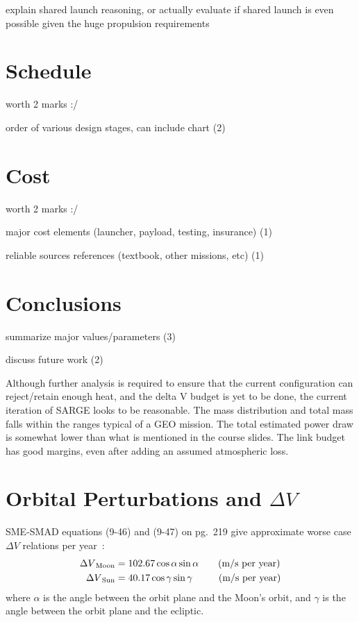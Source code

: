 \documentclass[9pt]{article}
\begin{document}
explain shared launch reasoning, or actually evaluate if shared launch is even possible given the huge propulsion requirements


\section{Schedule}
worth 2 marks :/

order of various design stages, can include chart (2)

\section{Cost}
worth 2 marks :/

major cost elements (launcher, payload, testing, insurance) (1)

reliable sources references (textbook, other missions, etc) (1)


\section{Conclusions}
summarize major values/parameters (3)

discuss future work (2)

Although further analysis is required to ensure that the current configuration can reject/retain enough heat, and the delta V budget is yet to be done, the current iteration of SARGE looks to be reasonable.
The mass distribution and total mass falls within the ranges typical of a GEO mission.
The total estimated power draw is somewhat lower than what is mentioned in the course slides.
The link budget has good margins, even after adding an assumed atmospheric loss.



\clearpage
\appendix

\printbibliography
\clearpage
\section{Orbital Perturbations and $\Delta V$}\label{app:orbpert}

SME-SMAD equations (9-46) and (9-47) on pg.~219 give approximate worse case $\Delta V$ relations per year~\cite{sme}:
\begin{align}
  {\Delta V}_\text{Moon} &= 102.67\cos\alpha\sin\alpha\hspace{2em}\text{(m/s per year)}\\
  {\Delta V}_\text{Sun} &= 40.17\cos\gamma\sin\gamma\hspace{2.7em}\text{(m/s per year)}
\end{align}
where $\alpha$ is the angle between the orbit plane and the Moon's orbit, and $\gamma$ is the angle between the orbit plane and the ecliptic.
\end{document}
